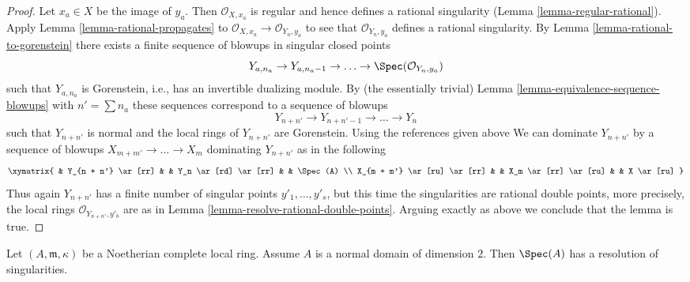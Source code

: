\begin{proof}
\medskip\noindent
Let $x_a \in X$ be the image of $y_a$. Then $\mathcal{O}_{X, x_a}$
is regular and hence defines a rational singularity
(Lemma \ref{lemma-regular-rational}).
Apply Lemma \ref{lemma-rational-propagates} to
$\mathcal{O}_{X, x_a} \to \mathcal{O}_{Y_n, y_a}$
to see that $\mathcal{O}_{Y_n, y_a}$ defines a
rational singularity. By Lemma \ref{lemma-rational-to-gorenstein}
there exists a finite sequence of blowups in singular closed points
$$
Y_{a, n_a} \to Y_{a, n_a - 1} \to \ldots \to \Spec(\mathcal{O}_{Y_n, y_a})
$$
such that $Y_{a, n_a}$ is Gorenstein, i.e., has an
invertible dualizing module. By (the essentially trivial)
Lemma \ref{lemma-equivalence-sequence-blowups}
with $n' = \sum n_a$ these sequences correspond to a sequence of
blowups
$$
Y_{n + n'} \to Y_{n + n' - 1} \to \ldots \to Y_n
$$
such that $Y_{n + n'}$ is normal and
the local rings of $Y_{n + n'}$ are Gorenstein. Using the references
given above We can dominate $Y_{n + n'}$ by a sequence of blowups
$X_{m + m'} \to \ldots \to X_m$ dominating $Y_{n + n'}$ as in the following
$$
\xymatrix{
 & Y_{n + n'} \ar[rr] & & Y_n \ar[rd] \ar[rr] & & \Spec(A) \\
X_{m + m'} \ar[ru] \ar[rr] & & X_m \ar[rr] \ar[ru] & & X \ar[ru]
}
$$
Thus again $Y_{n + n'}$ has a finite number of singular points
$y'_1, \ldots, y'_s$, but this time the singularities are
rational double points, more precisely, the local rings
$\mathcal{O}_{Y_{n + n'}, y'_b}$ are as in
Lemma \ref{lemma-resolve-rational-double-points}.
Arguing exactly as above we conclude that the lemma is true.
\end{proof}

\begin{lemma}
\label{lemma-resolve-complete}
Let $(A, \mathfrak m, \kappa)$ be a Noetherian complete local ring.
Assume $A$ is a normal domain of dimension $2$. Then $\Spec(A)$ has a
resolution of singularities.
\end{lemma}

